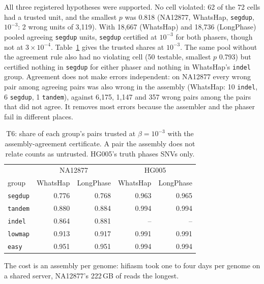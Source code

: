 \documentclass[11pt]{article}
\theoremstyle{definition}
\theoremstyle{remark}
\begin{document}
All three registered hypotheses were supported. No cell violated: 62 of the
72 cells had a trusted unit, and the smallest $p$ was 0.818 (NA12877,
WhatsHap, \texttt{segdup}, $10^{-3}$: 2 wrong units of 3{,}119). With
18{,}667 (WhatsHap) and 18{,}736 (LongPhase) pooled agreeing \texttt{segdup}
units, \texttt{segdup} certified at $10^{-3}$ for both phasers, though not at
$3\times10^{-4}$. Table~\ref{tab:t6} gives the trusted shares at $10^{-3}$.
The same pool without the agreement rule also had no violating cell (50
testable, smallest $p$ 0.793) but certified nothing in \texttt{segdup} for
either phaser and nothing in WhatsHap's \texttt{indel} group. Agreement does
not make errors independent: on NA12877 every wrong pair among agreeing
pairs was also wrong in the assembly (WhatsHap: 10 \texttt{indel}, 6
\texttt{segdup}, 1 \texttt{tandem}), against 6{,}175, 1{,}147 and 357 wrong
pairs among the pairs that did not agree. It removes most errors because
the assembler and the phaser fail in different places.

\begin{table}[t]
\centering\footnotesize
\begin{tabular}{@{}lrrrr@{}}
\toprule
 & \multicolumn{2}{c}{NA12877} & \multicolumn{2}{c}{HG005}\\
group & WhatsHap & LongPhase & WhatsHap & LongPhase\\
\midrule
\texttt{segdup} & 0.776 & 0.768 & 0.963 & 0.965\\
\texttt{tandem} & 0.880 & 0.884 & 0.994 & 0.994\\
\texttt{indel} & 0.864 & 0.881 & -- & --\\
\texttt{lowmap} & 0.913 & 0.917 & 0.991 & 0.991\\
\texttt{easy} & 0.951 & 0.951 & 0.994 & 0.994\\
\bottomrule
\end{tabular}
\caption{T6: share of each group's pairs trusted at $\beta=10^{-3}$ with the
assembly-agreement certificate. A pair the assembly does not relate counts
as untrusted. HG005's truth phases SNVs only.}
\label{tab:t6}
\end{table}

The cost is an assembly per genome: hifiasm took one to four days per genome
on a shared server, NA12877's 222\,GB of reads the longest.
\end{document}
